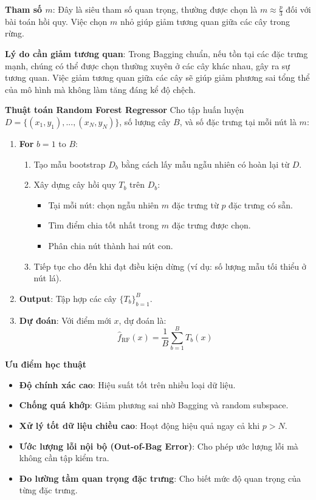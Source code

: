 \documentclass[12pt]{report}
\begin{document}
{\textbf{Tham số $m$}: Đây là siêu tham số quan trọng, thường được chọn là $m \approx \frac{p}{3}$ đối với bài toán hồi quy. Việc chọn $m$ nhỏ giúp giảm tương quan giữa các cây trong rừng.

\textbf{Lý do cần giảm tương quan}: Trong Bagging chuẩn, nếu tồn tại các đặc trưng mạnh, chúng có thể được chọn thường xuyên ở các cây khác nhau, gây ra sự tương quan. Việc giảm tương quan giữa các cây sẽ giúp giảm phương sai tổng thể của mô hình mà không làm tăng đáng kể độ chệch.

\textbf*{Thuật toán Random Forest Regressor}
Cho tập huấn luyện $D = \{(x_1, y_1), ..., (x_N, y_N)\}$, số lượng cây $B$, và số đặc trưng tại mỗi nút là $m$:

\begin{enumerate}
    \item \textbf{For} $b = 1$ to $B$:
    \begin{enumerate}
        \item Tạo mẫu bootstrap $D_b$ bằng cách lấy mẫu ngẫu nhiên có hoàn lại từ $D$.
        \item Xây dựng cây hồi quy $T_b$ trên $D_b$:
        \begin{itemize}
            \item Tại mỗi nút: chọn ngẫu nhiên $m$ đặc trưng từ $p$ đặc trưng có sẵn.
            \item Tìm điểm chia tốt nhất trong $m$ đặc trưng được chọn.
            \item Phân chia nút thành hai nút con.
        \end{itemize}
        \item Tiếp tục cho đến khi đạt điều kiện dừng (ví dụ: số lượng mẫu tối thiểu ở nút lá).
    \end{enumerate}
    \item \textbf{Output}: Tập hợp các cây $\{T_b\}_{b=1}^{B}$.
    \item \textbf{Dự đoán}: Với điểm mới $x$, dự đoán là:
    \[
    \hat{f}_{\text{RF}}(x) = \frac{1}{B} \sum_{b=1}^{B} T_b(x)
    \]
\end{enumerate}

\textbf*{Ưu điểm học thuật}
\begin{itemize}
    \item \textbf{Độ chính xác cao}: Hiệu suất tốt trên nhiều loại dữ liệu.
    \item \textbf{Chống quá khớp}: Giảm phương sai nhờ Bagging và random subspace.
    \item \textbf{Xử lý tốt dữ liệu chiều cao}: Hoạt động hiệu quả ngay cả khi $p > N$.
    \item \textbf{Ước lượng lỗi nội bộ (Out-of-Bag Error)}: Cho phép ước lượng lỗi mà không cần tập kiểm tra.
    \item \textbf{Đo lường tầm quan trọng đặc trưng}: Cho biết mức độ quan trọng của từng đặc trưng.
\end{itemize}

}
\end{document}
